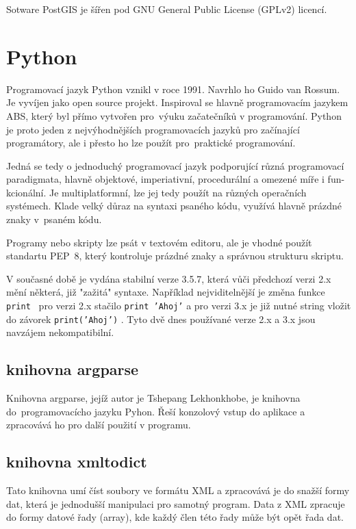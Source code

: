 Sotware PostGIS je šířen pod GNU General Public License (GPLv2) licencí.


\section{Python}
\label{Python}
Programovací jazyk Python vznikl v roce 1991. Navrhlo ho Guido van Rossum. 
Je vyvíjen jako open source projekt. Inspiroval se hlavně programovacím jazykem
ABS, který byl přímo vytvořen pro~výuku začatečníků v programování. Python je 
proto jeden z nejvýhodnějších programovacích jazyků pro začínající programátory,
ale i přesto ho lze použít pro~praktické programování. 

Jedná se tedy o jednoduchý programovací jazyk podporující různá programovací 
paradigmata, hlavně objektové, imperiativní, procedurální a omezené míře i 
fun- kcionální. Je multiplatformní, lze jej tedy použít na různých operačních 
systémech. Klade velký důraz na syntaxi psaného kódu, využívá hlavně prázdné 
znaky v~psaném kódu.  

Programy nebo skripty lze psát v textovém editoru, ale je vhodné použít 
standartu PEP~8, který kontroluje prázdné znaky a správnou strukturu skriptu. 

V současné době je vydána stabilní verze 3.5.7, která vůči předchozí verzi 2.x
mění některá, již "zažitá" syntaxe. Například nejviditelnější je změna funkce 
{\tt print } pro verzi 2.x stačilo  {\tt print 'Ahoj'}  a pro verzi 3.x je již
nutné string vložit do závorek  {\tt print('Ahoj')}  . Tyto dvě dnes používané
verze 2.x a 3.x jsou navzájem nekompatibilní.
\cite{python} 
\cite{wikiPython} 
  
  
\subsection{knihovna argparse}
\label{argparse} 
Knihovna argparse, jejíž autor je Tshepang Lekhonkhobe, je knihovna 
do~programovacícho jazyku Pyhon. Řeší konzolový vstup do aplikace a zpracovává 
ho pro další použití v programu.\cite{argparse}


\subsection{knihovna xmltodict}
\label{xmltodict} 
Tato knihovna umí číst soubory ve formátu XML a zpracovává je do snažší formy 
dat, která je jednodušší manipulaci pro samotný program. Data z XML zpracuje
do formy datové řady (array), kde každý člen této řady může být opět řada dat.\cite{xmltodict}

